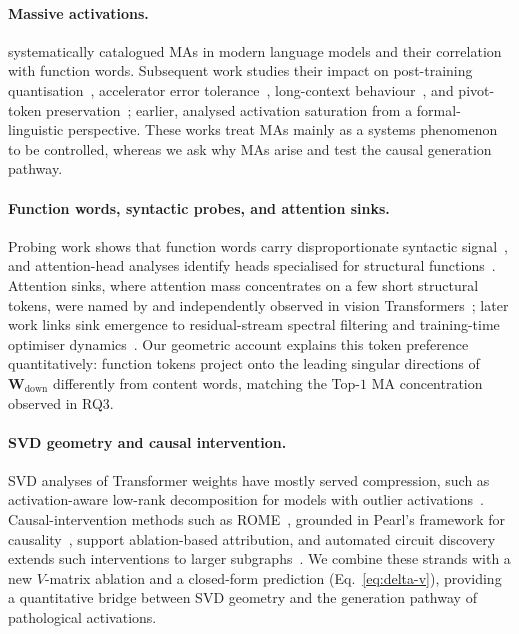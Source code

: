 \documentclass{article}
\newcommand{\Wdown}{\mathbf{W}_{\text{down}}}
\begin{document}
\paragraph{Massive activations.}
\citet{sun2024massive} systematically catalogued MAs in modern language
models and their correlation with function words. Subsequent work studies
their impact on post-training quantisation~\citep{dettmers2022gpt3,xiao2023smoothquant,bondarenko2023quantizable,shao2024omniquant},
accelerator error tolerance~\citep{liu2024alberta}, long-context
behaviour~\citep{liu2024lost}, and pivot-token
preservation~\citep{liu2024intactkv}; earlier, \citet{merrill2022saturated}
analysed activation saturation from a formal-linguistic perspective. These
works treat MAs mainly as a systems phenomenon to be controlled, whereas we
ask why MAs arise and test the causal generation pathway.

\paragraph{Function words, syntactic probes, and attention sinks.}
Probing work shows that function words carry disproportionate syntactic
signal~\citep{hewitt2019structural,tenney2019bert,jawahar2019does}, and
attention-head analyses identify heads specialised for structural
functions~\citep{voita2019analyzing}. Attention sinks, where attention
mass concentrates on a few short structural tokens, were named by
\citet{xiao2024efficient} and independently observed in vision
Transformers~\citep{darcet2024registers}; later work links sink emergence
to residual-stream spectral filtering and training-time optimiser
dynamics~\citep{cancedda2024spectral,gu2025attention}. Our geometric
account explains this token preference quantitatively: function tokens
project onto the leading singular directions of $\Wdown$ differently from
content words, matching the Top-$1$ MA concentration observed in RQ3.

\paragraph{SVD geometry and causal intervention.}
SVD analyses of Transformer weights have mostly served compression, such
as activation-aware low-rank decomposition for models with outlier
activations~\citep{yuan2023asvd}. Causal-intervention methods such as
ROME~\citep{meng2022locating}, grounded in Pearl's framework for
causality~\citep{pearl2009causality}, support ablation-based attribution,
and automated circuit discovery extends such interventions to larger
subgraphs~\citep{conmy2023towards}. We combine these strands with a new
$V$-matrix ablation and a closed-form prediction (Eq.~\eqref{eq:delta-v}),
providing a quantitative bridge between SVD geometry and the generation
pathway of pathological activations.
\end{document}
